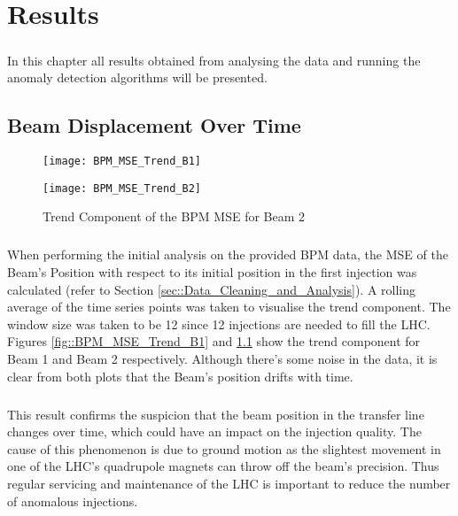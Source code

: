 \chapter{Results}
\label{chp4}

\paragraph{ }In this chapter all results obtained from analysing the data and running the anomaly detection algorithms will be presented. 

\section{Beam Displacement Over Time}

\begin{figure}[!b]
	\begin{minipage}[b]{0.475\linewidth}
		\centering
		\texttt{[image: BPM\_MSE\_Trend\_B1]}
		\caption[BPM MSE Trend B1]{Trend Component of the BPM MSE for Beam 1}
		\label{fig::BPM_MSE_Trend_B1}
	\end{minipage}	
	\hspace{0.25cm}
	\begin{minipage}[b]{0.475\linewidth}
		\centering
		\texttt{[image: BPM\_MSE\_Trend\_B2]}
		\caption[BPM MSE Trend B2]{Trend Component of the BPM MSE for Beam 2}
		\label{fig::BPM_MSE_Trend_B2}
	\end{minipage}	
\end{figure}

\paragraph{ }When performing the initial analysis on the provided \acs{BPM} data, the \acs{MSE} of the Beam's Position with respect to its initial position in the first injection was calculated (refer to Section \ref{sec::Data_Cleaning_and_Analysis}). A rolling average of the time series points was taken to visualise the trend component. The window size was taken to be 12 since 12 injections are needed to fill the \acs{LHC}. Figures \ref{fig::BPM_MSE_Trend_B1} and \ref{fig::BPM_MSE_Trend_B2} show the trend component for Beam 1 and Beam 2 respectively. Although there's some noise in the data, it is clear from both plots that the Beam's position drifts with time.

\paragraph{ }This result confirms the suspicion that the beam position in the transfer line changes over time, which could have an impact on the injection quality. The cause of this phenomenon is due to ground motion as the slightest movement in one of the \acs{LHC}'s quadrupole magnets can throw off the beam's precision. Thus regular servicing and maintenance of the \acs{LHC} is important to reduce the number of anomalous injections.


